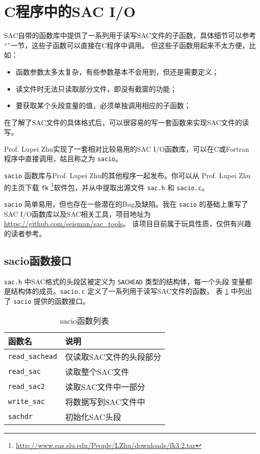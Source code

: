\section{C程序中的SAC I/O}
SAC自带的函数库中提供了一系列用于读写SAC文件的子函数，具体细节可以参考
``''一节，这些子函数可以直接在C程序中调用。
但这些子函数用起来不太方便，比如：
\begin{itemize}
\item 函数参数太多太复杂，有些参数基本不会用到，但还是需要定义；
\item 读文件时无法只读取部分文件，即没有截窗的功能；
\item 要获取某个头段变量的值，必须单独调用相应的子函数；
\end{itemize}

在了解了SAC文件的具体格式后，可以很容易的写一套函数来实现SAC文件的读写。

Prof. Lupei Zhu实现了一套相对比较易用的SAC I/O函数库，可以在C或Fortran
程序中直接调用，姑且称之为 \texttt{sacio}。

\texttt{sacio} 函数库与Prof. Lupei Zhu的其他程序一起发布。你可以从
Prof. Lupei Zhu的主页下载 \texttt{fk} \footnote{\url{http://www.eas.slu.edu/People/LZhu/downloads/fk3.2.tar}}软件包，并从中提取出源文件 \texttt{sac.h} 和 \texttt{sacio.c}。

\texttt{sacio} 简单易用，但也存在一些潜在的Bug及缺陷。我在 \texttt{sacio} 的基础上重写了
SAC I/O函数库以及SAC相关工具，项目地址为 \url{https://github.com/seisman/sac_tools}。
该项目目前属于玩具性质，仅供有兴趣的读者参考。

\subsection{sacio函数接口}
\texttt{sac.h} 中SAC格式的头段区被定义为 \texttt{SACHEAD} 类型的结构体，每一个头段
变量都是结构体的成员。\texttt{sacio.c} 定义了一系列用于读写SAC文件的函数，
表 \ref{table:sacio-function} 中列出了 \texttt{sacio} 提供的函数接口。

\begin{table}[H]
\centering
\caption{sacio函数列表}
\label{table:sacio-function}
\begin{tabular}{ll}
\toprule
函数名      &   说明        \\
\midrule
\verb|read_sachead|      &   仅读取SAC文件的头段部分 \\
\verb|read_sac|          &   读取整个SAC文件 \\
\verb|read_sac2|         &   读取SAC文件中一部分 \\
\verb|write_sac|         &   将数据写到SAC文件中 \\
\verb|sachdr|            &   初始化SAC头段\\
\bottomrule
\end{tabular}
\end{table}

